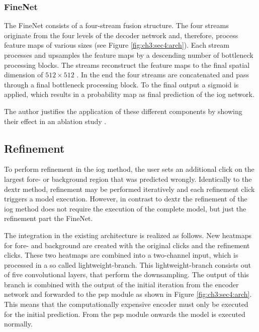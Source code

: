 \subsubsection{FineNet}
The FineNet consists of a four-stream fusion structure.
The four streams originate from the four levels of the decoder network and, therefore, process feature maps of various sizes (see Figure \ref{fig:ch3:sec4:arch}).
Each stream processes and upsamples the feature maps by a descending number of bottleneck processing blocks.
The streams reconstruct the feature maps to the final spatial dimension of $512 \times 512$ .
In the end the four streams are concatenated and pass through a final bottleneck processing block.
To the final output a sigmoid is applied, which results in a probability map as final prediction of the \gls{iog} network.

The author justifies the application of these different components by showing their effect in an ablation study \cite{Zha20-IOG}.


\subsection{Refinement}\label{ord:ch3:sec4:subsec4}

To perform refinement in the \gls{iog} method, the user sets an additional click on the largest fore- or background region that was predicted wrongly.
Identically to the \gls{dextr} method, refinement may be performed iteratively and each refinement click triggers a model execution.
However, in contrast to \gls{dextr} the refinement of the \gls{iog} method does not require the execution of the complete model, but just the refinement part the FineNet.

The integration in the existing architecture is realized as follows.
New heatmaps for fore- and background are created with the original clicks and the refinement clicks.
These two heatmaps are combined into a two-channel input, which is processed in a so called lightweight-branch.
This lightweight-branch consists out of five convolutional layers, that perform the downsampling.
The output of this branch is combined with the output of the initial iteration from the encoder network and forwarded to the \gls{psp} module as shown in Figure \ref{fig:ch3:sec4:arch}.
This means that the computationally expensive encoder must only be executed for the initial prediction.
From the \gls{psp} module onwards the model is executed normally.

